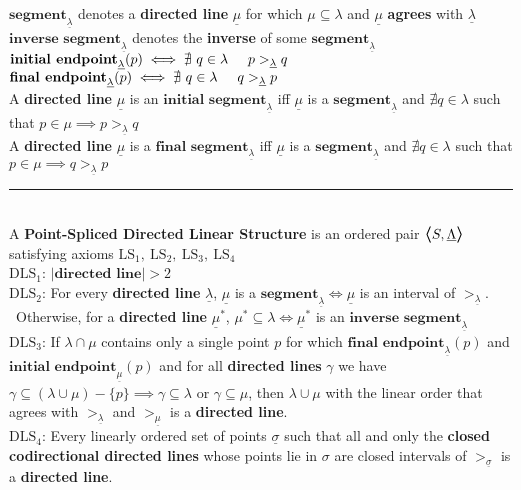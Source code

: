 \documentclass{article}
\newcommand{\hsp}[1][5]{\hspace{0.#1 cm}}
\newcommand{\hcm}[1][1]{\hspace{#1 cm}}
\newcommand{\bra}[1][1.2]{\scalebox{#1}{$\boldsymbol{\langle}$}}
\newcommand{\nl}[1][12]{\\[#1pt]}
\newcommand{\ket}[1][1.2]{\scalebox{#1}{$\boldsymbol{\rangle}$}}
\newcommand{\ch}[1]{\text{#1}}
\newcommand {\chb}[1]{\textbf{#1}}
\newcommand{\ul}[1]{\underline{#1}}
\begin{document}
\begin{flushleft}
$\chb{segment}_{\underline{\lambda}}$ denotes a \chb{directed line} $\underline{\mu}$ for which $\mu \subseteq \lambda$ and $\underline{\mu}$ \chb{agrees} with $\underline{\lambda}$\nl[5]
\hsp[2] $\chb{inverse segment}_{\underline{\lambda}}$ denotes the \chb{inverse} of some $\chb{segment}_{\underline{\lambda}}$\nl[10]

\hsp[2] $\chb{initial endpoint}_{\ul{\lambda}}(p) \iff \nexists\ q \in \lambda\hsp p >_{\ul{\lambda}} q$\nl[5]
\hsp[2] $\chb{final endpoint}_{\ul{\lambda}}(p) \iff \nexists\ q \in \lambda\hsp q >_{\ul{\lambda}} p$\nl[10]

\hsp[2] A \chb{directed line} $\ul{\mu}$ is an $\chb{initial segment}_{\ul{\lambda}}$ iff $\ul{\mu}$ is a $\chb{segment}_{\ul{\lambda}}$ and $\nexists q \in \lambda$ such that $p \in \mu \implies p >_{\ul{\lambda}} q$\nl[5]
\hsp[2] A \chb{directed line} $\ul{\mu}$ is a $\chb{final segment}_{\ul{\lambda}}$ iff $\ul{\mu}$ is a $\chb{segment}_{\ul{\lambda}}$ and $\nexists q \in \lambda$ such that $p \in \mu \implies q >_{\ul{\lambda}} p$\nl[15]

\par\noindent\rule{\textwidth}{0.4pt}\nl[8] %

A \chb{Point-Spliced Directed Linear Structure} is an ordered pair $\bra S, \ul{\Lambda} \ket$ satisfying axioms $\ch{LS}_1,\ \ch{LS}_2,\ \ch{LS}_3,\ \ch{LS}_4$\nl[10]

$\ch{DLS}_1$: $|\chb{directed line}| > 2$\nl[15]

$\ch{DLS}_2$: For every \chb{directed line} $\ul{\lambda}$, $\ul{\mu}$ is a $\chb{segment}_{\ul{\lambda}} \iff \ul{\mu}$ is an interval of $>_{\ul{\lambda}}$.\\\hcm\  Otherwise, for a \chb{directed line} $\ul{\mu}^*$, $\mu^* \subseteq \lambda \iff \ul{\mu}^*$ is an $\chb{inverse segment}_{\ul{\lambda}}$\nl[15]

$\ch{DLS}_3$: If $\lambda \cap \mu$ contains only a single point $p$ for which $\chb{final endpoint}_{\ul{\lambda}}(p)$ and $\chb{initial endpoint}_{\ul{\mu}}(p)$ and for all \chb{directed lines} $\gamma$ we have {\color{purple} $\gamma \subseteq (\lambda \cup \mu) - \{p\} \implies \gamma \subseteq \lambda$ or $\gamma \subseteq \mu$}, then $\lambda \cup \mu$ with the linear order that agrees with $>_{\ul{\lambda}}$ and $>_{\ul{\mu}}$ is a \chb{directed line}.\nl[15]

$\ch{DLS}_4$: Every linearly ordered set of points $\ul{\sigma}$ such that all and only the \chb{closed codirectional directed lines} whose points lie in $\sigma$ are closed intervals of $>_{\ul{\sigma}}$ is a \chb{directed line}.


\end{flushleft}
\end{document}
